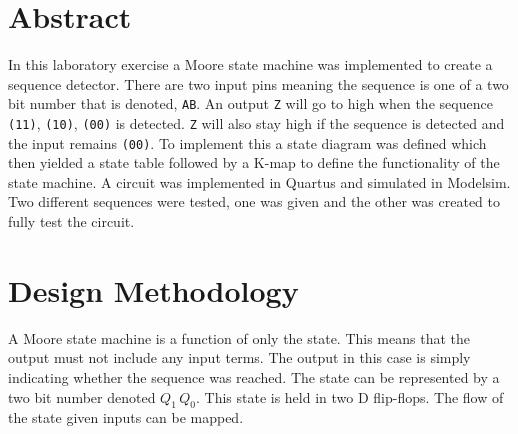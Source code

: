 \documentclass[CMPE]{KGCOEReport}
\begin{document}
\maketitle

\section*{Abstract}

In this laboratory exercise a Moore state machine was implemented to create a sequence detector. There are two input pins meaning the sequence is one of a two bit number that is denoted, \texttt{AB}. An output \texttt{Z} will go to high when the sequence \texttt{(11)}, \texttt{(10)}, \texttt{(00)} is detected. \texttt{Z} will also stay high if the sequence is detected and the input remains \texttt{(00)}. To implement this a state diagram was defined which then yielded a state table followed by a K-map to define the functionality of the state machine. A circuit was implemented in Quartus and simulated in Modelsim. Two different sequences were tested, one was given and the other was created to fully test the circuit.

\section*{Design Methodology}

A Moore state machine is a function of only the state. This means that the output must not include any input terms. The output in this case is simply indicating whether the sequence was reached. The state can be represented by a two bit number denoted $Q_1\,Q_0$. This state is held in two D flip-flops. The flow of the state given inputs can be mapped.\\
\end{document}
